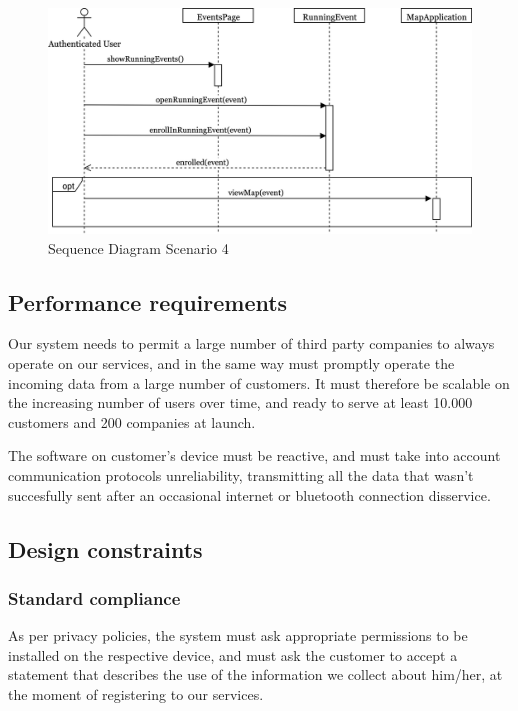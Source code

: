 \documentclass[../main.tex]{subfiles}
\begin{document}
		\begin{figure}[H]
			\centering
			\includegraphics[scale=.08]{images/sequenceDiagram4.png}
			\caption{Sequence Diagram Scenario 4 \label{fig:Sequence Diagram Scenario 4}}
		\end{figure}
		

\subsection{Performance requirements}

Our system needs to permit a large number of third party companies to always operate on our services, and in the same way must promptly operate the incoming data from a large number of customers. It must therefore be scalable on the increasing number of users over time, and ready to serve at least 10.000 customers and 200 companies at launch.

The software on customer's device must be reactive, and must take into account communication protocols unreliability, transmitting all the data that wasn't succesfully sent after an occasional internet or bluetooth connection disservice.

\subsection{Design constraints}

\subsubsection{Standard compliance}

As per privacy policies, the system must ask appropriate permissions to be installed on the respective device, and must ask the customer to accept a statement that describes the use of the information we collect about him/her, at the moment of registering to our services.
\end{document}
